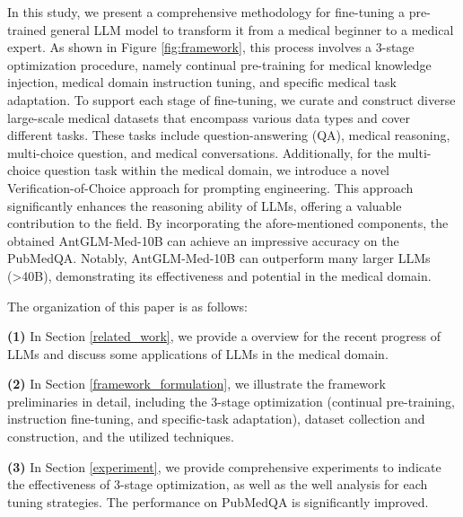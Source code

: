 \documentclass{article} %
\begin{document}
In this study, we present a comprehensive methodology for fine-tuning a pre-trained general LLM model to transform it from a medical beginner to a medical expert. As shown in Figure \ref{fig:framework}, this process involves a 3-stage optimization procedure, namely continual pre-training for medical knowledge injection, medical domain instruction tuning, and specific medical task adaptation. To support each stage of fine-tuning, we curate and construct diverse large-scale medical datasets that encompass various data types and cover different tasks. These tasks include question-answering (QA), medical reasoning, multi-choice question, and medical conversations. Additionally, for the multi-choice question task within the medical domain, we introduce a novel Verification-of-Choice approach for prompting engineering. This approach significantly enhances the reasoning ability of LLMs, offering a valuable contribution to the field. By incorporating the afore-mentioned components, the obtained AntGLM-Med-10B can achieve an impressive accuracy on the PubMedQA. Notably, AntGLM-Med-10B can outperform many larger LLMs (>40B), demonstrating its effectiveness and potential in the medical domain.

The organization of this paper is as follows: 

\textbf{(1)} In Section \ref{related_work}, we provide a overview for the recent progress of LLMs and discuss some applications of LLMs in the medical domain. 

\textbf{(2)} In Section \ref{framework_formulation}, we illustrate the framework preliminaries in detail, including the 3-stage optimization (continual pre-training, instruction fine-tuning, and specific-task adaptation), dataset collection and construction, and the utilized techniques. 

\textbf{(3)} In Section \ref{experiment}, we provide comprehensive experiments to indicate the effectiveness of 3-stage optimization, as well as the well analysis for each tuning strategies. The performance on PubMedQA is significantly improved.

\newpage
\end{document}
